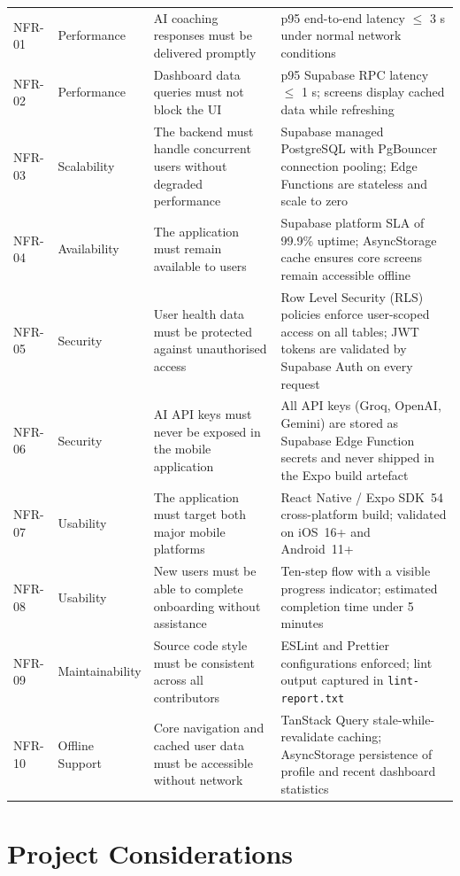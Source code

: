 \begin{xltabular}{\textwidth}{llXX}
		NFR-01 & Performance    & AI coaching responses must be delivered promptly & p95 end-to-end latency $\leq$ 3 s under normal network conditions \\[3pt]
		NFR-02 & Performance    & Dashboard data queries must not block the UI & p95 Supabase RPC latency $\leq$ 1 s; screens display cached data while refreshing \\[3pt]
		NFR-03 & Scalability    & The backend must handle concurrent users without degraded performance & Supabase managed PostgreSQL with PgBouncer connection pooling; Edge Functions are stateless and scale to zero \\[3pt]
		NFR-04 & Availability   & The application must remain available to users & Supabase platform SLA of 99.9\% uptime; AsyncStorage cache ensures core screens remain accessible offline \\[3pt]
		NFR-05 & Security       & User health data must be protected against unauthorised access & Row Level Security (RLS) policies enforce user-scoped access on all tables; JWT tokens are validated by Supabase Auth on every request \\[3pt]
		NFR-06 & Security       & AI API keys must never be exposed in the mobile application & All API keys (Groq, OpenAI, Gemini) are stored as Supabase Edge Function secrets and never shipped in the Expo build artefact \\[3pt]
		NFR-07 & Usability      & The application must target both major mobile platforms & React Native / Expo SDK~54 cross-platform build; validated on iOS~16+ and Android~11+ \\[3pt]
		NFR-08 & Usability      & New users must be able to complete onboarding without assistance & Ten-step flow with a visible progress indicator; estimated completion time under 5 minutes \\[3pt]
		NFR-09 & Maintainability & Source code style must be consistent across all contributors & ESLint and Prettier configurations enforced; lint output captured in \texttt{lint-report.txt} \\[3pt]
		NFR-10 & Offline Support & Core navigation and cached user data must be accessible without network & TanStack Query stale-while-revalidate caching; AsyncStorage persistence of profile and recent dashboard statistics \\
		\bottomrule
	\end{xltabular}


\section{Project Considerations}


